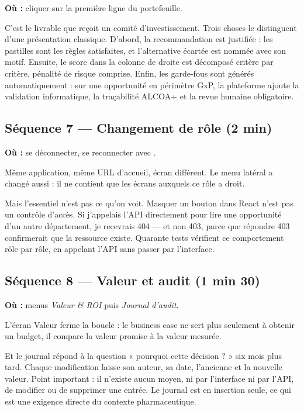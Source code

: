 \textbf{Où :} cliquer sur la première ligne du portefeuille.

\begin{oral}
C'est le livrable que reçoit un comité d'investissement. Trois choses le distinguent
d'une présentation classique. D'abord, la recommandation est justifiée : les pastilles
sont les règles satisfaites, et l'alternative écartée est nommée avec son motif.
Ensuite, le score dans la colonne de droite est décomposé critère par critère, pénalité
de risque comprise. Enfin, les garde-fous sont générés automatiquement : sur une
opportunité en périmètre GxP, la plateforme ajoute la validation informatique, la
traçabilité ALCOA+ et la revue humaine obligatoire.
\end{oral}

\subsection*{Séquence 7 — Changement de rôle (2 min)}

\textbf{Où :} se déconnecter, se reconnecter avec .

\begin{oral}
Même application, même URL d'accueil, écran différent. Le menu latéral a changé aussi :
il ne contient que les écrans auxquels ce rôle a droit.

Mais l'essentiel n'est pas ce qu'on voit. Masquer un bouton dans React n'est pas un
contrôle d'accès. Si j'appelais l'API directement pour lire une opportunité d'un autre
département, je recevrais 404 — et non 403, parce que répondre 403 confirmerait que la
ressource existe. Quarante tests vérifient ce comportement rôle par rôle, en appelant
l'API sans passer par l'interface.
\end{oral}

\subsection*{Séquence 8 — Valeur et audit (1 min 30)}

\textbf{Où :} menus \emph{Valeur \& ROI} puis \emph{Journal d'audit}.

\begin{oral}
L'écran Valeur ferme la boucle : le business case ne sert plus seulement à obtenir un
budget, il compare la valeur promise à la valeur mesurée.

Et le journal répond à la question « pourquoi cette décision ? » six mois plus tard.
Chaque modification laisse son auteur, sa date, l'ancienne et la nouvelle valeur. Point
important : il n'existe aucun moyen, ni par l'interface ni par l'API, de modifier ou de
supprimer une entrée. Le journal est en insertion seule, ce qui est une exigence directe
du contexte pharmaceutique.
\end{oral}

